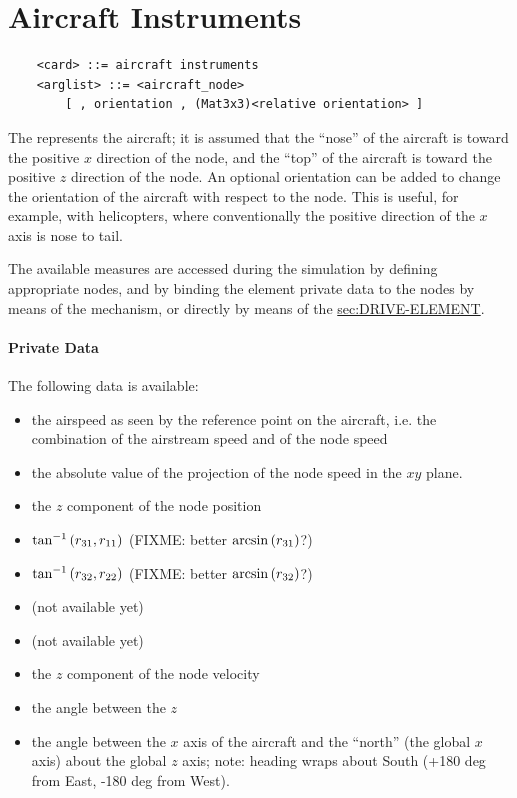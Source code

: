 \section{Aircraft Instruments}
\begin{verbatim}
    <card> ::= aircraft instruments
    <arglist> ::= <aircraft_node>
        [ , orientation , (Mat3x3)<relative orientation> ]
\end{verbatim}
The  represents the aircraft; it is assumed
that the ``nose'' of the aircraft is toward the positive $x$ direction
of the node, and the ``top'' of the aircraft is toward the positive 
$z$ direction of the node.
An optional orientation can be added to change the orientation 
of the aircraft with respect to the node.
This is useful, for example, with helicopters, where conventionally
the positive direction of the $x$ axis is nose to tail.

The available measures are accessed during the simulation 
by defining appropriate  nodes, and by binding
the  element private data to the nodes 
by means of the  mechanism, or directly by means
of the 
\hyperref{\kw{element} drive}{\kw{element} drive (see Section~}{)}{sec:DRIVE-ELEMENT}.

\paragraph{Private Data}
The following data is available:
\begin{itemize}
\item {} the airspeed as seen by the reference 
	point on the aircraft, i.e. the combination 
	of the airstream speed and of the node speed
\item {} the absolute value of the projection
	of the node speed in the $xy$ plane.
\item {} the $z$ component of the node position
\item {} $\tan^{-1}\left( r_{31}, r_{11} \right)$
	(FIXME: better $\arcsin\left( r_{31} \right)$?)
\item {} $\tan^{-1}\left( r_{32}, r_{22} \right)$
	(FIXME: better $\arcsin\left( r_{32} \right)$?)
\item {} (not available yet)
\item {} (not available yet)
\item {} the $z$ component of the node velocity
\item {} the angle between the $z$ 
\item {} the angle between the $x$ axis of the aircraft 
	and the ``north'' (the global $x$ axis) about the global $z$ axis;
	note: heading wraps about South
	(+180 deg from East, -180 deg from West).
\end{itemize}

